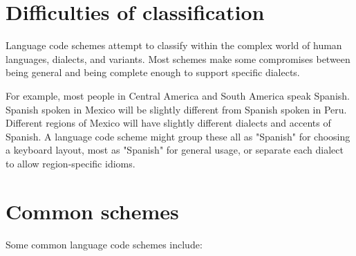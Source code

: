 \section{Difficulties of classification}


Language code schemes attempt to classify within the complex world of human languages, dialects, and variants. Most schemes make some compromises between being general and being complete enough to support specific dialects.

For example, most people in Central America and South America speak Spanish. Spanish spoken in Mexico will be slightly different from Spanish spoken in Peru. Different regions of Mexico will have slightly different dialects and accents of Spanish. A language code scheme might group these all as "Spanish" for choosing a keyboard layout, most as "Spanish" for general usage, or separate each dialect to allow region-specific idioms.


\section{Common schemes}

Some common language code schemes include:

